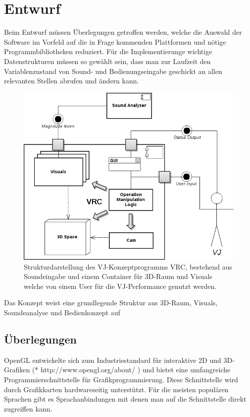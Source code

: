 \section{Entwurf}

Beim Entwurf m\"ussen \"Uberlegungen getroffen werden, welche die Auswahl der Software im Vorfeld auf
die in Frage kommenden Plattformen und n\"otige Programmbibliotheken reduziert. F\"ur die Implementierunge
wichtige Datenstrukturen m\"ussen so gew\"ahlt sein, dass man zur Laufzeit den Variablenzustand von Sound-
und Bedienungseingabe geschickt an allen relevanten Stellen abrufen und \"andern kann.

\begin{figure}[h!]
    \centering
    \includegraphics[width=1\textwidth]{pictures/vrc-component1.png}
    \caption{Strukturdarstellung des VJ-Konzeptprogramms VRC, bestehend aus Soundeingabe und einem Container f\"ur
    3D-Raum und Visuals welche von einem User f\"ur die VJ-Performance genutzt werden.}
\end{figure}

Das Konzept weist eine grundlegende Struktur aus 3D-Raum, Visuals, Soundeanalyse und Bedienkonzept auf


\subsection{\"Uberlegungen}

OpenGL entwickelte sich zum Industriestandard f\"ur interaktive 2D und 3D-Grafiken (* http://www.opengl.org/about/ )
und bietet eine umfangreiche Programmierschnittstelle f\"ur Grafikprogrammierung. Diese Schnittstelle wird durch
Grafikkarten hardwareseitig unterst\"utzt. F\"ur die meisten popul\"aren Sprachen gibt es Sprachanbindungen mit denen
man auf die Schnittstelle direkt zugreiffen kann.

